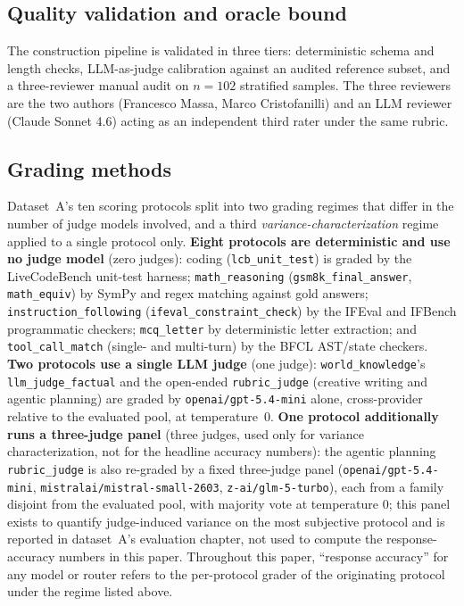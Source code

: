 \documentclass[twocolumn,10pt,a4paper]{article}
\begin{document}
\subsection{Quality validation and oracle bound}
The construction pipeline is validated in three tiers: deterministic schema and length checks, LLM-as-judge calibration against an audited reference subset, and a three-reviewer manual audit on $n{=}102$ stratified samples. The three reviewers are the two authors (Francesco Massa, Marco Cristofanilli) and an LLM reviewer (Claude Sonnet 4.6) acting as an independent third rater under the same rubric.

\subsection{Grading methods}\label{sec:grading}
Dataset~A's ten scoring protocols split into two grading regimes that differ in the number of judge models involved, and a third \emph{variance-characterization} regime applied to a single protocol only. \textbf{Eight protocols are deterministic and use no judge model} (zero judges): coding (\texttt{lcb\_unit\_test}) is graded by the LiveCodeBench unit-test harness; \texttt{math\_reasoning} (\texttt{gsm8k\_final\_answer}, \texttt{math\_equiv}) by SymPy and regex matching against gold answers; \texttt{instruction\_following} (\texttt{ifeval\_constraint\_check}) by the IFEval and IFBench programmatic checkers; \texttt{mcq\_letter} by deterministic letter extraction; and \texttt{tool\_call\_match} (single- and multi-turn) by the BFCL AST/state checkers. \textbf{Two protocols use a single LLM judge} (one judge): \texttt{world\_knowledge}'s \texttt{llm\_judge\_factual} and the open-ended \texttt{rubric\_judge} (creative writing and agentic planning) are graded by \texttt{openai/gpt-5.4-mini} alone, cross-provider relative to the evaluated pool, at temperature~$0$. \textbf{One protocol additionally runs a three-judge panel} (three judges, used only for variance characterization, not for the headline accuracy numbers): the agentic planning \texttt{rubric\_judge} is also re-graded by a fixed three-judge panel (\texttt{openai/gpt-5.4-mini}, \texttt{mistralai/mistral-small-2603}, \texttt{z-ai/glm-5-turbo}), each from a family disjoint from the evaluated pool, with majority vote at temperature $0$; this panel exists to quantify judge-induced variance on the most subjective protocol and is reported in dataset~A's evaluation chapter, not used to compute the response-accuracy numbers in this paper. Throughout this paper, ``response accuracy'' for any model or router refers to the per-protocol grader of the originating protocol under the regime listed above.
\end{document}
